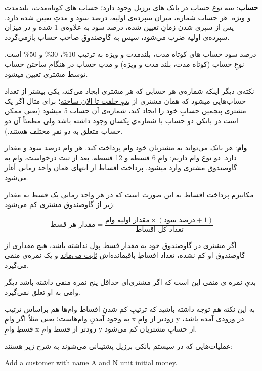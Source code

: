 \documentclass[]{article}
\begin{document}
\textbf{حساب}: سه نوع حساب در بانک های برزیل وجود دارد؛ حساب های \underline{کوتاه‌مدت}، \underline{بلندمدت} و \underline{ویژه}. هر حساب \underline{شماره}، \underline{میزان سپرده‌ی اولیه}، \underline{درصد سود} و \underline{مدتِ تعیین شده‌} دارد. پس از سپری شدن زمانِ تعیین شده، درصد سود به علاوه‌ی 1 شده و  در میزان سپرده‌ی اولیه ضرب می‌شود، سپس به گاوصندوق صاحب حساب بازمی‌گردد.

درصد سود حساب های کوتاه مدت، بلندمدت و ویژه به ترتیب 10\%، 30\% و 50\% است. نوعِ حساب (کوتاه مدت، بلند مدت و ویژه) و مدتِ حساب در هنگامِ ساختن حساب توسط مشتری تعیین میشود.



نکته‌ی دیگر اینکه شماره‌ی هر حسابی که هر مشتری ایجاد می‌کند، یکی بیشتر از تعداد حساب‌هایی میشود که همان مشتری از \underline{بدوِ خلقت تا الان ساخته}؛ برای مثال اگر یک مشتری پنجمین حسابِ خود را ایجاد کند، شماره‌ی آن حساب 5 میشود (یعنی ممکن است در بانکی دو حساب با شماره‌ی یکسان وجود داشته باشد ولی مطمئاً آن دو حساب متعلق به دو نفرِ مختلف هستند.).

\KashidaOn

\textbf{وام}: هر بانک می‌تواند به مشتریان خود وام پرداخت کند. هر وام \underline{درصد سود }و \underline{مقدار} دارد. دو نوع وام داریم: وامِ 6 قسطه و 12 قسطه. بعد از ثبت درخواست، وام به گاوصندوق مشتری وارد میشود. \underline{پرداخت اقساط از انتهای همان واحد زمانی آغاز می‌شود.
}

\KashidaOff
مکانیزم پرداخت اقساط به این صورت است که در هر واحد زمانی یک قسط به مقدار زیر از گاوصندوق مشتری کم می‌شود:

$$\text{مقدار هر قسط}=\frac{\text{مقدار اولیه وام} \times (\text{درصد سود} + \text{1})}{\text{تعداد کل اقساط}}$$

اگر مشتری در گاوصندوق خود به مقدار قسط پول نداشته باشد، هیچ مقداری از گاوصندوق او کم نشده، تعداد اقساطِ باقیمانده‌اش \underline{ثابت می‌ماند} و یک نمره‌ی منفی می‌گیرد.

بدیِ نمره ی منفی این است که اگر مشتری‌ای حداقل پنج نمره‌ منفی داشته باشد دیگر وامی به او تعلق نمی‌گیرد.

به این نکته هم توجه داشته باشید که ترتیبِ کم شدنِ اقساط وام‌ها هم براساس ترتیب به وجود آمدنِ وام‌هاست؛ یعنی مثلاً اگر وامِ x زودتر از وامِ y در ورودی آمده باشد، قسطِ وامِ x زودتر از قسط وامِ y از حسابِ مشتریان کم می‌شود.

عملیات‌هایی که در سیستم بانکی برزیل پشتیبانی می‌شوند به شرح زیر هستند:

\begin{tcolorbox}[boxrule=0pt]
	\begin{latin}
  	  \large{
  	  	Add a customer with name A and N unit initial money.
		}
	\end{latin}
\end{tcolorbox}
\end{document}
